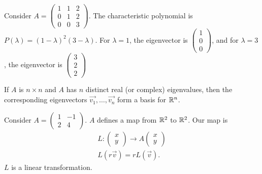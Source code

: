 \begin{eg}
  Consider $A=\begin{pmatrix} 1&1&2\\0&1&2\\0&0&3 \end{pmatrix} $. The characteristic polynomial is $P(\lambda)=(1-\lambda)^2(3-\lambda)$. For $ \lambda = 1$, the eigenvector is $\begin{pmatrix} 1\\0\\0 \end{pmatrix} $, and for $\lambda = 3$, the eigenvector is $\begin{pmatrix} 3\\2\\2 \end{pmatrix} $ 
\end{eg}
\begin{theorem}
  If $A $ is $n\times n$ and $A$ has $n$ distinct real (or complex) eigenvalues, then the corresponding eigenvectors $\vec{v_1},\ldots,\vec{v_n}$ form a basis for $\mathbb{R}^{n}$.
\end{theorem}
  Consider $A=\begin{pmatrix} 1&-1\\2&4 \end{pmatrix} $. $A$ defines a map from $\mathbb{R}^{2}$ to $\mathbb{R}^2$. Our map is 
  \begin{align*}
    L: \begin{pmatrix} x\\y \end{pmatrix}\to A\begin{pmatrix} x\\y \end{pmatrix}\\
    L\left( r\vec{v} \right) =rL(\vec{v})
  .\end{align*}
  $L$ is a linear transformation.

